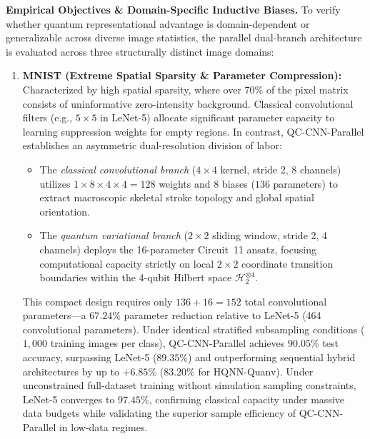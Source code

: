 \documentclass[journal]{IEEEtran}
\begin{document}
\textbf{Empirical Objectives \& Domain-Specific Inductive Biases.} 
To verify whether quantum representational advantage is domain-dependent or generalizable across diverse image statistics, the parallel dual-branch architecture is evaluated across three structurally distinct image domains:
\begin{enumerate}
    \item \textbf{MNIST (Extreme Spatial Sparsity \& Parameter Compression):} 
    Characterized by high spatial sparsity, where over $70\%$ of the pixel matrix consists of uninformative zero-intensity background. Classical convolutional filters (e.g., $5 \times 5$ in LeNet-5) allocate significant parameter capacity to learning suppression weights for empty regions. In contrast, QC-CNN-Parallel establishes an asymmetric dual-resolution division of labor:
    \begin{itemize}
        \item The \textit{classical convolutional branch} ($4 \times 4$ kernel, stride 2, 8 channels) utilizes $1 \times 8 \times 4 \times 4 = 128$ weights and 8 biases ($136$ parameters) to extract macroscopic skeletal stroke topology and global spatial orientation.
        \item The \textit{quantum variational branch} ($2 \times 2$ sliding window, stride 2, 4 channels) deploys the 16-parameter Circuit~11 ansatz, focusing computational capacity strictly on local $2 \times 2$ coordinate transition boundaries within the 4-qubit Hilbert space $\mathcal{H}_2^{\otimes 4}$.
    \end{itemize}
    This compact design requires only $136 + 16 = 152$ total convolutional parameters---a $67.24\%$ parameter reduction relative to LeNet-5 (464 convolutional parameters). Under identical stratified subsampling conditions ($1,000$ training images per class), QC-CNN-Parallel achieves $90.05\%$ test accuracy, surpassing LeNet-5 ($89.35\%$) and outperforming sequential hybrid architectures by up to $+6.85\%$ ($83.20\%$ for HQNN-Quanv). Under unconstrained full-dataset training without simulation sampling constraints, LeNet-5 converges to $97.45\%$, confirming classical capacity under massive data budgets while validating the superior sample efficiency of QC-CNN-Parallel in low-data regimes.


\end{enumerate}
\end{document}
